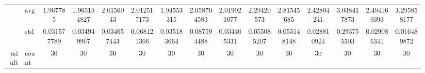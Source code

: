 \begin{table}[H]
{\begin{tabular}{rlccc|c|c|c|c|c|ccccc}
			                                                                               & avg                & \cellcolor[rgb]{ .506,  .776,  .486}1.967785                                   & \cellcolor[rgb]{ .494,  .773,  .486}1.965134827                                & \cellcolor[rgb]{ .765,  .851,  .502}2.0156043                                  & \cellcolor[rgb]{ .749,  .847,  .502}2.012517173 & \cellcolor[rgb]{ .388,  .745,  .482}\textcolor[rgb]{ 0,  .38,  0}{1.94553315}  & \cellcolor[rgb]{ 1,  .922,  .518}2.058704583    & \cellcolor[rgb]{ .788,  .859,  .502}2.019921077                                & \cellcolor[rgb]{ .996,  .827,  .502}2.29420573  & \cellcolor[rgb]{ .984,  .612,  .459}2.81545685  & \cellcolor[rgb]{ .992,  .773,  .49}2.42804241   & \cellcolor[rgb]{ .98,  .522,  .443}3.038417873  & \cellcolor[rgb]{ .992,  .745,  .486}2.494169393 & \cellcolor[rgb]{ .973,  .412,  .42}3.295858177  \\
			                                                                               & std                & 0.031577789                                                                    & 0.034949967                                                                    & 0.034657443                                                                    & 0.068121366                                     & 0.035183664                                                                    & 0.087594488                                     & 0.034405331                                                                    & 0.055085207                                     & 0.055148148                                     & 0.028810924                                     & 0.293755503                                     & 0.029086341                                     & 0.016489872                                     \\
			adult                                                                          & count              & 30                                                                             & 30                                                                             & 30                                                                             & 30                                              & 30                                                                             & 30                                              & 30                                                                             & 30                                              & 30                                              & 30                                              & 30                                              & 30                                              & 30                                              \\

\end{tabular}}
\end{table}
